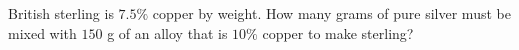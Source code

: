 British sterling is $7.5\%$ copper by weight. How many grams of pure silver must be mixed with $150$ g of an alloy that is $10\%$ copper to make sterling?

